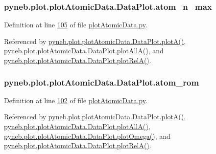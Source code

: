 \hypertarget{classpyneb_1_1plot_1_1plot_atomic_data_1_1_data_plot_a668572cfe9a684e7195535d60d343938}{}
\subsubsection[{atom\+\_\+n\+\_\+max}]{\setlength{\rightskip}{0pt plus 5cm}pyneb.\+plot.\+plot\+Atomic\+Data.\+Data\+Plot.\+atom\+\_\+n\+\_\+max}\label{classpyneb_1_1plot_1_1plot_atomic_data_1_1_data_plot_a668572cfe9a684e7195535d60d343938}


Definition at line \hyperlink{plot_atomic_data_8py_source_l00105}{105} of file \hyperlink{plot_atomic_data_8py_source}{plot\+Atomic\+Data.\+py}.



Referenced by \hyperlink{plot_atomic_data_8py_source_l00116}{pyneb.\+plot.\+plot\+Atomic\+Data.\+Data\+Plot.\+plot\+A()}, \hyperlink{plot_atomic_data_8py_source_l00188}{pyneb.\+plot.\+plot\+Atomic\+Data.\+Data\+Plot.\+plot\+All\+A()}, and \hyperlink{plot_atomic_data_8py_source_l00261}{pyneb.\+plot.\+plot\+Atomic\+Data.\+Data\+Plot.\+plot\+Rel\+A()}.

\hypertarget{classpyneb_1_1plot_1_1plot_atomic_data_1_1_data_plot_a334c448311ed9dc8cd700af504e06254}{}
\subsubsection[{atom\+\_\+rom}]{\setlength{\rightskip}{0pt plus 5cm}pyneb.\+plot.\+plot\+Atomic\+Data.\+Data\+Plot.\+atom\+\_\+rom}\label{classpyneb_1_1plot_1_1plot_atomic_data_1_1_data_plot_a334c448311ed9dc8cd700af504e06254}


Definition at line \hyperlink{plot_atomic_data_8py_source_l00102}{102} of file \hyperlink{plot_atomic_data_8py_source}{plot\+Atomic\+Data.\+py}.



Referenced by \hyperlink{plot_atomic_data_8py_source_l00116}{pyneb.\+plot.\+plot\+Atomic\+Data.\+Data\+Plot.\+plot\+A()}, \hyperlink{plot_atomic_data_8py_source_l00188}{pyneb.\+plot.\+plot\+Atomic\+Data.\+Data\+Plot.\+plot\+All\+A()}, \hyperlink{plot_atomic_data_8py_source_l00372}{pyneb.\+plot.\+plot\+Atomic\+Data.\+Data\+Plot.\+plot\+Omega()}, and \hyperlink{plot_atomic_data_8py_source_l00261}{pyneb.\+plot.\+plot\+Atomic\+Data.\+Data\+Plot.\+plot\+Rel\+A()}.

